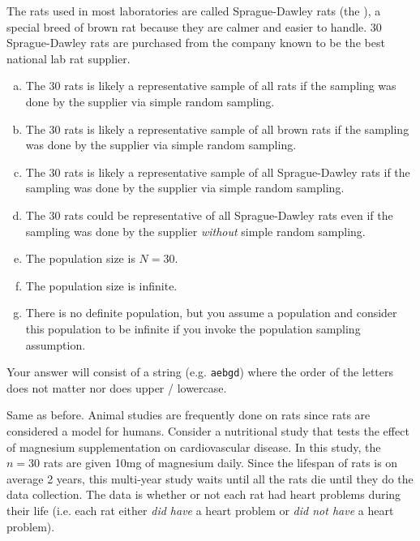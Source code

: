 \documentclass[12pt,landscape]{article}
\newcommand{\instr}{\small Your answer will consist of a string (e.g. \texttt{aebgd}) where the order of the letters does not matter nor does upper / lowercase. \normalsize}
\begin{document}



\problem{} The rats used in most laboratories are called Sprague-Dawley rats (the ), a special breed of brown rat because they are calmer and easier to handle. 30 Sprague-Dawley rats are purchased from the company known to be the best national lab rat supplier.

\vspace{-0.2cm}\benum{} 

\begin{enumerate}[(a)]
\item The 30 rats is likely a representative sample of all rats if the sampling was done by the supplier via simple random sampling.
\item The 30 rats is likely a representative sample of all brown rats if the sampling was done by the supplier via simple random sampling.
\item The 30 rats is likely a representative sample of all Sprague-Dawley rats if the sampling was done by the supplier via simple random sampling.
\item The 30 rats could be representative of all Sprague-Dawley rats even if the sampling was done by the supplier \emph{without} simple random sampling.
\item The population size is $N=30$.
\item The population size is infinite.
\item There is no definite population, but you assume a population and consider this population to be infinite if you invoke the population sampling assumption.
\end{enumerate}
\eenum\instr\pagebreak



\problem{} Same as before.  Animal studies are frequently done on rats since rats are considered a model for humans. Consider a nutritional study that tests the effect of magnesium supplementation on cardiovascular disease. In this study, the $n=30$ rats are given 10mg of magnesium daily. Since the lifespan of rats is on average 2 years, this multi-year study waits until all the rats die until they do the data collection. The data is whether or not each rat had heart problems during their life (i.e. each rat either \emph{did have} a heart problem or \emph{did not have} a heart problem).
\end{document}
